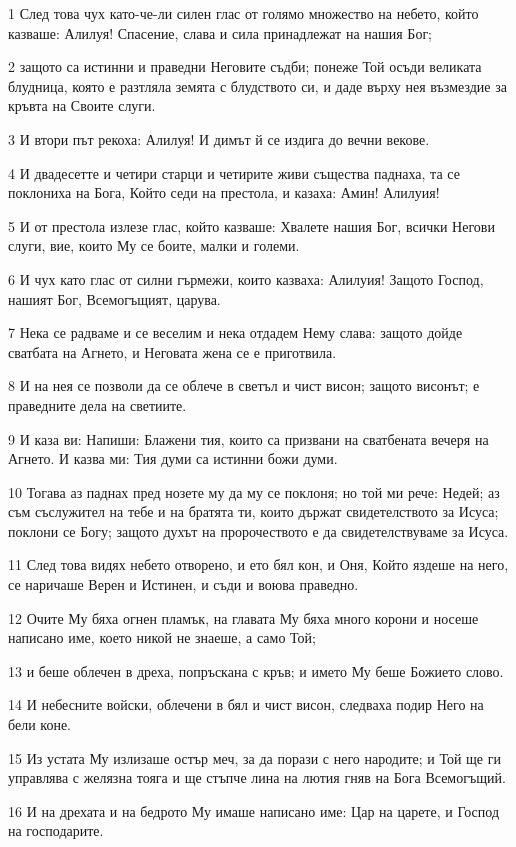 \par 1 След това чух като-че-ли силен глас от голямо множество на небето, който казваше: Алилуя! Спасение, слава и сила принадлежат на нашия Бог;
\par 2 защото са истинни и праведни Неговите съдби; понеже Той осъди великата блудница, която е разтляла земята с блудството си, и даде върху нея възмездие за кръвта на Своите слуги.
\par 3 И втори път рекоха: Алилуя! И димът й се издига до вечни векове.
\par 4 И двадесетте и четири старци и четирите живи същества паднаха, та се поклониха на Бога, Който седи на престола, и казаха: Амин! Алилуия!
\par 5 И от престола излезе глас, който казваше: Хвалете нашия Бог, всички Негови слуги, вие, които Му се боите, малки и големи.
\par 6 И чух като глас от силни гърмежи, които казваха: Алилуия! Защото Господ, нашият Бог, Всемогъщият, царува.
\par 7 Нека се радваме и се веселим и нека отдадем Нему слава: защото дойде сватбата на Агнето, и Неговата жена се е приготвила.
\par 8 И на нея се позволи да се облече в светъл и чист висон; защото висонът; е праведните дела на светиите.
\par 9 И каза ви: Напиши: Блажени тия, които са призвани на сватбената вечеря на Агнето. И казва ми: Тия думи са истинни божи думи.
\par 10 Тогава аз паднах пред нозете му да му се поклоня; но той ми рече: Недей; аз съм съслужител на тебе и на братята ти, които държат свидетелството за Исуса; поклони се Богу; защото духът на пророчеството е да свидетелствуваме за Исуса.
\par 11 След това видях небето отворено, и ето бял кон, и Оня, Който яздеше на него, се наричаше Верен и Истинен, и съди и воюва праведно.
\par 12 Очите Му бяха огнен пламък, на главата Му бяха много корони и носеше написано име, което никой не знаеше, а само Той;
\par 13 и беше облечен в дреха, попръскана с кръв; и името Му беше Божието слово.
\par 14 И небесните войски, облечени в бял и чист висон, следваха подир Него на бели коне.
\par 15 Из устата Му излизаше остър меч, за да порази с него народите; и Той ще ги управлява с желязна тояга и ще стъпче лина на лютия гняв на Бога Всемогъщий.
\par 16 И на дрехата и на бедрото Му имаше написано име: Цар на царете, и Господ на господарите.
